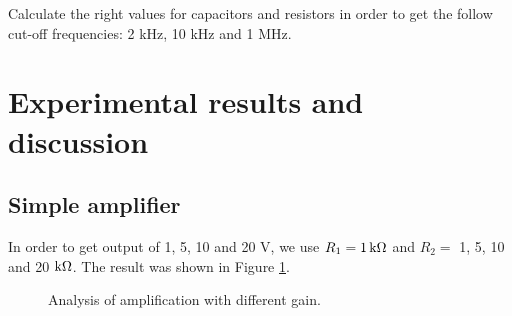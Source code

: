 \documentclass{article}
\newcommand{\unit}[1]{{\rm\,#1}}
\begin{document}
Calculate the right values for capacitors and resistors in order to get the follow cut-off frequencies: 2 kHz, 10 kHz and 1 MHz.

\newpage

\section{Experimental results and discussion}

\subsection{Simple amplifier}

In order to get output of 1, 5, 10 and 20 V, we use $R_1=1\unit{k\Omega}$ and $R_2=$ 1, 5, 10 and 20 $\rm{k\Omega}$. The result was shown in Figure \ref{fig-1-1}.

\begin{figure}[htbp]
	\centering
	\caption{Analysis of amplification with different gain.}
	\label{fig-1-1}
\end{figure}
\end{document}
